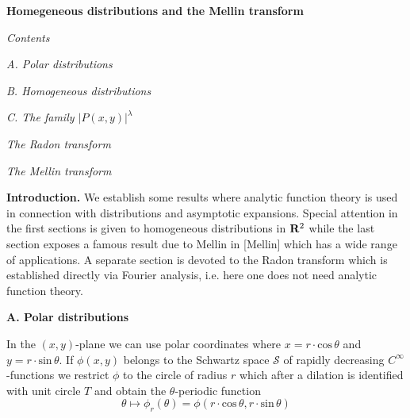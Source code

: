 





 
%

\centerline{\bf\large{Homegeneous distributions and the Mellin transform}}

\bigskip

\centerline{\emph{Contents}}

\bigskip

\noindent
\emph {A. Polar distributions}
\bigskip

\noindent
\emph {B. Homogeneous distributions}
\bigskip

\noindent
\emph {C. The family $|P(x,y)|^\lambda$}
\bigskip

\noindent
\emph{The Radon transform}



\bigskip

\noindent
\emph{The Mellin transform}

\bigskip

\noindent
{\bf{Introduction.}}
We establish some results where analytic function theory
is used in connection with distributions and
asymptotic expansions.
Special attention in the first sections is given to
homogeneous distributions in
${\bf{R}}^2$
while the last section exposes a famous result due to Mellin in [Mellin]
which has a wide range of applications.
A separate section is devoted to the Radon transform which is
established directly via Fourier analysis, i.e. here one  does not need
analytic function theory.





\bigskip


\centerline{\bf  {A. Polar distributions}}

\bigskip

\noindent
In the $(x,y)$-plane we can use polar coordinates where
$x=r\cdot\text{cos}\,\theta$ and
$y=r\cdot\text{sin}\,\theta$.
If $\phi(x,y)$ belongs to the Schwartz space $\mathcal S$
of rapidly decreasing $C^\infty$-functions  we  restrict $\phi$ to the
circle of radius $r$ which after a dilation is identified
with  unit circle $T$ and
obtain the $\theta$-periodic function
\[ 
\theta\mapsto \phi_r(\theta)= \phi(r\cdot\text{cos}\,\theta,r\cdot\text{sin}\,\theta)\tag{0.1}
\]
\medskip

